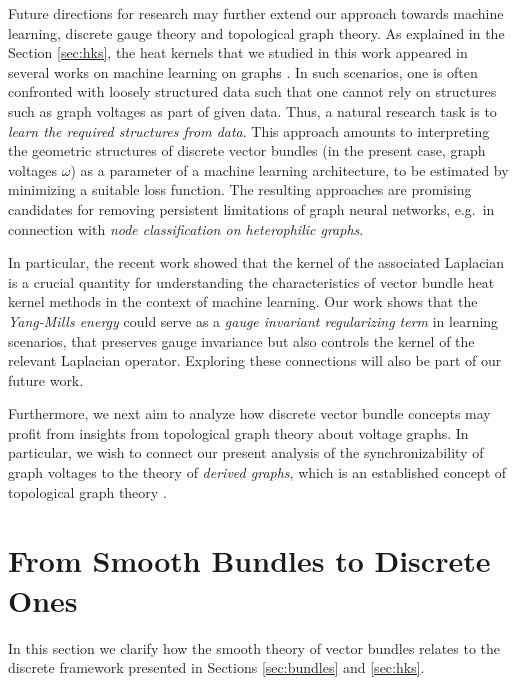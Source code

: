 \documentclass[10pt,reqno]{amsart}
\numberwithin{equation}{section}
\theoremstyle{bfnote}
\theoremstyle{bfdef}
\begin{document}
\vspace{0.25cm}
Future directions for research may further extend our approach towards machine learning, discrete gauge theory and topological graph theory.
%
As explained in the Section \ref{sec:hks}, the heat kernels that we studied in this work appeared in several works on machine learning on graphs \cite{bodnarNeuralSheafDiffusion2023,bambergerBundleNeuralNetworks2024,cassel2025bundle}.
In such scenarios, one is often confronted with loosely structured data such that one cannot rely on structures such as graph voltages as part of given data. Thus, a natural research task is to \textit{learn the required structures from data}. This approach amounts to interpreting the geometric structures of discrete vector bundles (in the present case, graph voltages $\omega$) as a parameter of a machine learning architecture, to be estimated by minimizing a suitable loss function.
The resulting approaches are promising candidates for removing persistent limitations of graph neural networks, e.g.~in connection with \textit{node classification on heterophilic graphs}.

In particular, the recent work \cite{bodnarNeuralSheafDiffusion2023} showed that the kernel of the associated Laplacian is a crucial quantity for understanding the characteristics of vector bundle heat kernel methods in the context of machine learning.
%
Our work shows that the \textit{Yang-Mills energy} could serve as a \textit{gauge invariant regularizing term} in learning scenarios, that preserves gauge invariance but also controls the kernel of the relevant Laplacian operator. Exploring these connections will also be part of our future work.

Furthermore, we next aim to analyze how discrete vector bundle concepts may profit from insights from topological graph theory about voltage graphs. In particular, we wish to connect our present analysis of the synchronizability of graph voltages to the theory of \textit{derived graphs}, which is an established concept of topological graph theory \cite{grossTopologicalGraphTheory1987}.



\appendix
\section{From Smooth Bundles to Discrete Ones}\label{sec:app}
\newcommand{\g}{\mathfrak{g}}

In this section we clarify how the smooth theory of vector bundles \cite{hamiltonMathematicalGaugeTheory2017,weilerCoordinateIndependentConvolutional2021,gerkenGeometricDeepLearning2021} relates to the discrete framework presented in Sections \ref{sec:bundles} and \ref{sec:hks}.
\end{document}
